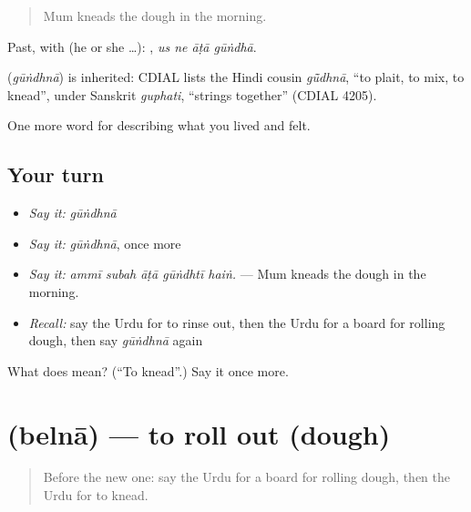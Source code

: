 \begin{quote}
Mum kneads the dough in the morning.
\end{quote}

Past, with  (he or she …):    , \emph{us ne āṭā gūṅdhā}.

\begin{cousinweb}
\textbf{} (\emph{gūṅdhnā}) is inherited: CDIAL lists the Hindi cousin \emph{gū̃dhnā}, \textquotedblleft{}to plait, to mix, to knead\textquotedblright{}, under Sanskrit \emph{guphati}, \textquotedblleft{}strings together\textquotedblright{} (CDIAL 4205).
\end{cousinweb}

\begin{grammarlens}[title={What you've built}]
One more word for describing what you lived and felt.
\end{grammarlens}

\subsection*{Your turn}
\begin{itemize}
\raggedright
  \item \emph{Say it:} \emph{gūṅdhnā}
  \item \emph{Say it:} \emph{gūṅdhnā}, once more
  \item \emph{Say it:} \emph{ammī subah āṭā gūṅdhtī haiṅ.} — Mum kneads the dough in the morning.
  \item \emph{Recall:} say the Urdu for to rinse out, then the Urdu for a board for rolling dough, then say \emph{gūṅdhnā} again
\end{itemize}

\begin{tcolorbox}[breakable,colback=teal!4,colframe=teal!35!black,title={Before you move on}]
What does  mean? (\textquotedblleft{}To knead\textquotedblright{}.) Say it once more.
\end{tcolorbox}
\section[\texorpdfstring{\ur{بیلنا} (belnā)}{بیلنا (belnā)}]{ (belnā) — to roll out (dough)}

\label{lesson:UR-C507-belna}



\begin{quote}
Before the new one: say the Urdu for a board for rolling dough, then the Urdu for to knead.
\end{quote}

